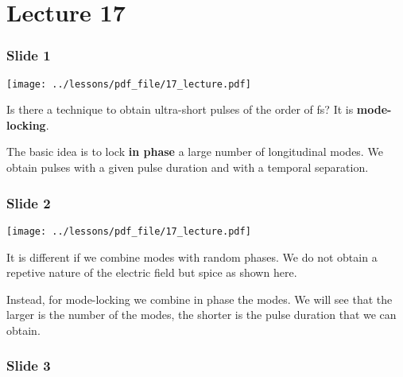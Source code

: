 \documentclass[../main/main.tex]{subfiles}
\begin{document}
\pagestyle{plain}

\section{Lecture 17}


\subsubsection*{Slide 1}

\begin{minipage}[]{0.5\linewidth}
\centering
\texttt{[image: ../lessons/pdf\_file/17\_lecture.pdf]}
\end{minipage}
\hspace{0.3cm}\vspace{0.3cm}
\begin{minipage}[c]{0.47\linewidth}

Is there a technique to obtain ultra-short pulses of the order of fs? It is \textbf{mode-locking}.

The basic idea is to lock \textbf{in phase} a large number of longitudinal modes. We obtain pulses with a given pulse duration and with a temporal separation.

\end{minipage}

\subsubsection*{Slide 2}

\begin{minipage}[]{0.5\linewidth}
\centering
\texttt{[image: ../lessons/pdf\_file/17\_lecture.pdf]}
\end{minipage}
\hspace{0.3cm}\vspace{0.3cm}
\begin{minipage}[c]{0.47\linewidth}

It is different if we combine modes with random phases. We do not obtain a repetive nature of the electric field but spice as shown here.

Instead, for mode-locking we combine in phase the modes. We will see that the larger is the number of the modes, the shorter is the pulse duration that we can obtain.

\end{minipage}

\subsubsection*{Slide 3}
\end{document}
